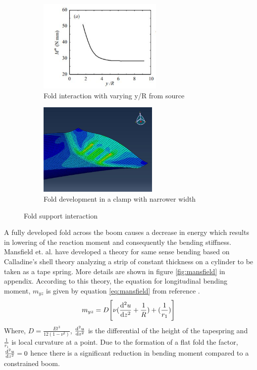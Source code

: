 \begin{figure}[!hbt]
     \centering
     \begin{subfigure}[b]{0.4\textwidth}
         \centering
    \includegraphics[height=4.5cm]{images/foldinteraction.JPG}
    \caption{Fold interaction with varying y/R from source \cite{Seffen1999}}
    \label{fig:foldint}
     \end{subfigure}
     \hfill
     \begin{subfigure}[b]{0.4\textwidth}
         \centering
    \includegraphics[height=4.5cm]{images/halfwidth.JPG}
     \caption{Fold development in a clamp with narrower width}
  \label{fig:case19}
     \end{subfigure}
     \caption{Fold support interaction}
\end{figure}
A fully developed fold across the boom causes a decrease in energy which results in lowering of the reaction moment and consequently the bending stiffness. Mansfield et. al. have developed a theory for same sense bending based on Calladine's shell theory \cite{calladine_1983} analyzing a strip of constant thickness on a cylinder to be taken as a tape spring. More details are shown in figure \ref{fig:mansfield} in appendix. According to this theory, the equation for longitudinal bending moment, $m_{yz}$ is given by equation \ref{eq:mansfield} from reference \cite{Seffen1999}. 
\begin{equation}
    m_{yz}=D\Bigg[\nu(\dv[2]{u}{z}+\frac{1}{R})+(\frac{1}{r_1})\Bigg]
    \label{eq:mansfield}
\end{equation}
Where, $D=\frac{Et^3}{12(1-\nu^2)}$, $\dv[2]{u}{z}$ is the differential of the height of the tapespring and $\frac{1}{r_1}$ is local curvature at a point. Due to the formation of a flat fold the factor, $\dv[2]{u}{z}=0$ hence there is a significant reduction in bending moment compared to a constrained boom. 
